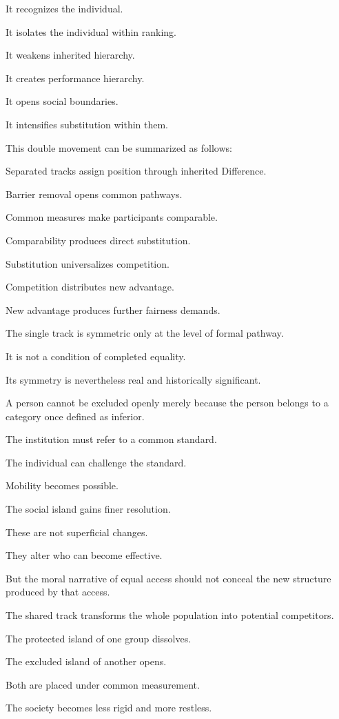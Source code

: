 It recognizes the individual.

It isolates the individual within ranking.

It weakens inherited hierarchy.

It creates performance hierarchy.

It opens social boundaries.

It intensifies substitution within them.

This double movement can be summarized as follows:

Separated tracks assign position through inherited Difference.

Barrier removal opens common pathways.

Common measures make participants comparable.

Comparability produces direct substitution.

Substitution universalizes competition.

Competition distributes new advantage.

New advantage produces further fairness demands.

The single track is symmetric only at the level of formal pathway.

It is not a condition of completed equality.

Its symmetry is nevertheless real and historically significant.

A person cannot be excluded openly merely because the person belongs to a category once defined as inferior.

The institution must refer to a common standard.

The individual can challenge the standard.

Mobility becomes possible.

The social island gains finer resolution.

These are not superficial changes.

They alter who can become effective.

But the moral narrative of equal access should not conceal the new structure produced by that access.

The shared track transforms the whole population into potential competitors.

The protected island of one group dissolves.

The excluded island of another opens.

Both are placed under common measurement.

The society becomes less rigid and more restless.

